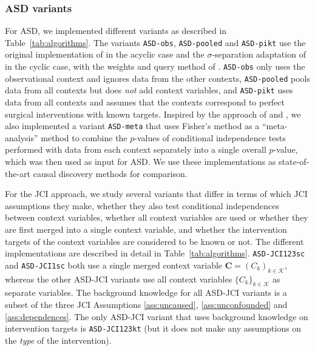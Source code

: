 \documentclass[twoside,11pt]{article}
\newcommand\B[1]{\bm{#1}}
\newcommand\C[1]{\mathcal{#1}}
\newcommand{\alg}[1]{\texttt{#1}}
\begin{document}
\subsubsection{ASD variants}
For ASD, we implemented different variants as described in Table~\ref{tab:algorithms}.
The variants \alg{ASD-obs}, \alg{ASD-pooled} and \alg{ASD-pikt} use 
the original implementation of \citet{HEJ2014} in the acyclic case
and the $\sigma$-separation adaptation of \citet{ForreMooij_UAI_18} in the
cyclic case, with the weights and query method
of \citet{MagliacaneClaassenMooij_NIPS_16}. \alg{ASD-obs} only uses the 
observational context and ignores data from the other contexts, \alg{ASD-pooled} 
pools data from all contexts but does \emph{not} add context variables, and
\alg{ASD-pikt} uses data from all contexts and assumes that the contexts correspond
to perfect surgical interventions with known targets. Inspired by the approach of
\citet{ION2009} and \citet{IOD2011}, we also implemented a variant \alg{ASD-meta}
that uses Fisher's method as a ``meta-analysis'' method to combine the $p$-values of conditional
independence tests performed with data from each context separately into a single 
overall $p$-value, which was then used as input for ASD. 
We use these implementations as state-of-the-art causal discovery methods for comparison.

For the JCI approach, we study several variants that differ in terms of which JCI assumptions
they make, whether they also test conditional independences between context variables, 
whether all context variables are used or whether they are first merged into a single
context variable, and whether the intervention targets of the context variables are 
considered to be known or not. The different implementations are described in detail
in Table~\ref{tab:algorithms}. 
\alg{ASD-JCI123sc} and \alg{ASD-JCI1sc} both use a single merged context variable $\B{C} = (C_k)_{k\in\C{K}}$, whereas
the other ASD-JCI variants use all context variables $\{C_k\}_{k\in\C{K}}$ as separate variables. The background knowledge for
all ASD-JCI variants is a subset of the three JCI Assumptions \ref{ass:uncaused}, \ref{ass:unconfounded} and \ref{ass:dependences}. The only ASD-JCI variant that uses background knowledge on intervention targets is \alg{ASD-JCI123kt} (but it does not make any assumptions on the \emph{type} of the intervention).
\end{document}
